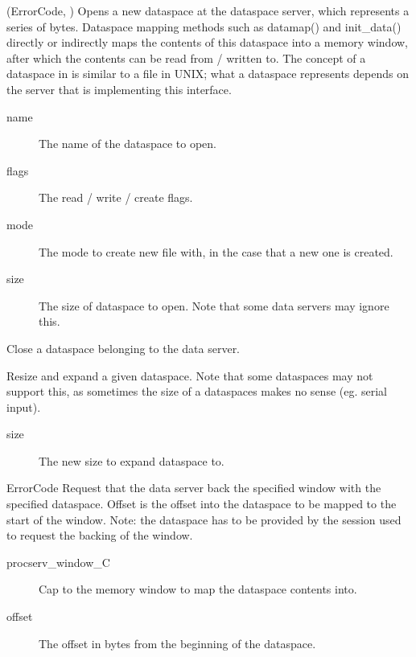 \begin{description}
      
    \item {}
        {(ErrorCode, )}
    Opens a new dataspace at the dataspace server, which represents a series of bytes. Dataspace
    mapping methods such as datamap() and init\_data() directly or indirectly maps the contents of
    this dataspace into a memory window, after which the contents can be read from / written to.
    The concept of a dataspace in  is similar to a file in UNIX; what a dataspace
    represents depends on the server that is implementing this interface.
    \begin{description}
        \item [name] The name of the dataspace to open.
        \item [flags] The read / write / create flags.
        \item [mode] The mode to create new file with, in the case that a new one is created.
        \item [size] The size of dataspace to open. Note that some data servers may ignore this.
    \end{description}

    \item {}
    Close a dataspace belonging to the data server.

    \item {}
    Resize and expand a given dataspace. Note that some dataspaces may not support this, as
    sometimes the size of a dataspaces makes no sense (eg. serial input).
    \begin{description}
        \item [size] The new size to expand dataspace to.
    \end{description}

    \item {}
        {ErrorCode}
    Request that the data server back the specified window with the specified dataspace. Offset is the
    offset into the dataspace to be mapped to the start of the window. Note: the dataspace has to be
    provided by the session used to request the backing of the window.
    \begin{description}
        \item [procserv\_window\_C] Cap to the memory window to map the dataspace contents into.
        \item [offset] The offset in bytes from the beginning of the dataspace.
    \end{description}


\end{description}
